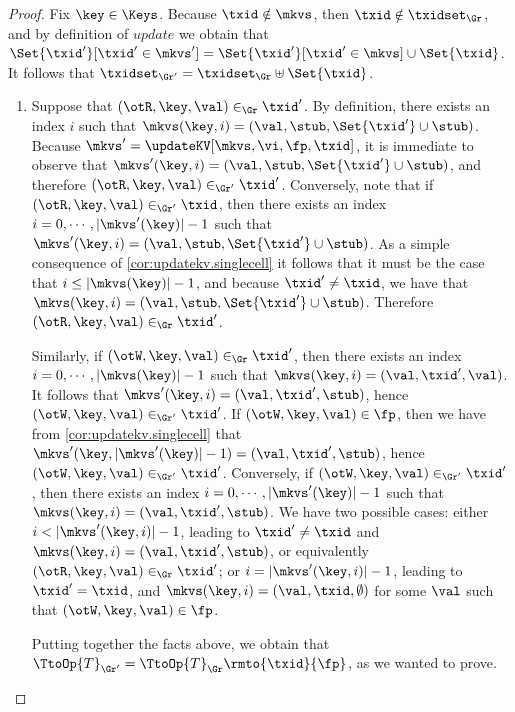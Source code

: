 \begin{proof}
Fix $\key \in \Keys$. Because $\txid \notin \mkvs$, then $\txid \notin \txidset_{\Gr}$, 
and by definition of $update$ we obtain that $\Set{\txid'}[\txid' \in \mkvs'] = 
\Set{\txid'}[\txid' \in \mkvs] \cup \Set{\txid}$. It follows that $\txidset_{\Gr'} = \txidset_{\Gr} \uplus \Set{\txid }$.

\begin{enumerate}
\item Suppose that $(\otR, \key, \val) \in_{\Gr} \txid'$. By definition, 
there exists an index $i$ such 
that $\mkvs(\key, i) = (\val, \stub, \Set{\txid'} \cup \stub)$. Because $\mkvs' = \updateKV[\mkvs, \vi, \fp, \txid]$, 
it is immediate to observe that $\mkvs'(\key, i) = (\val, \stub, \Set{\txid'} \cup \stub)$, and therefore 
$(\otR,\key, \val) \in_{\Gr'} \txid'$. Conversely, note that if $(\otR, \key, \val) \in_{\Gr'} \txid$, 
then there exists an index $i = 0,\cdots, \lvert \mkvs'(\key) \rvert - 1$ such that 
$\mkvs'(\key, i) = (\val, \stub, \Set{\txid'} \cup \stub)$. As a simple consequence of \cref{cor:updatekv.singlecell} 
it follows that it must be the case that $i \leq \lvert \mkvs(\key) \rvert - 1$, and because 
$\txid' \neq \txid$, we have that $\mkvs(\key, i) = (\val, \stub, \Set{\txid'} \cup \stub)$. Therefore 
$(\otR, \key, \val) \in_{\Gr} \txid'$. 

Similarly, if $(\otW, \key, \val) \in_{\Gr} \txid'$, 
then there exists an index $i=0,\cdots, \lvert \mkvs(\key) \rvert - 1$ such that 
$\mkvs(\key, i) = (\val, \txid', \val)$. It follows that $\mkvs'(\key, i) = (\val, \txid', \stub)$, hence 
$(\otW, \key, \val) \in_{\Gr'} \txid'$. If $(\otW, \key, \val) \in \fp$, then we 
have from \cref{cor:updatekv.singlecell} that $\mkvs'(\key, \lvert \mkvs'(\key) \rvert - 1) = (\val, \txid', \stub)$, 
hence $(\otW, \key, \val) \in_{\Gr'} \txid'$. 
Conversely, if $(\otW, \key, \val) \in_{\Gr'} \txid'$, then there exists an index 
$i = 0, \cdots, \lvert \mkvs'(\key) \rvert - 1$ such that $\mkvs(\key, i) = (\val, \txid', \stub)$. 
We have two possible cases: either $i < \lvert \mkvs'(\key, i) \rvert - 1$, leading to  
$\txid' \neq \txid$ and $\mkvs(\key, i) = (\val, \txid', \stub)$, or equivalently 
$(\otR,\key, \val) \in_{\Gr} \txid'$; or $i = \lvert \mkvs'(\key, i) \rvert - 1$, 
leading to $\txid' = \txid$, and $\mkvs(\key, i) = (\val, \txid, \emptyset)$ 
for some $\val$ such that $(\otW, \key, \val) \in \fp$. 

Putting together the facts above, we obtain that $\TtoOp{T}_{\Gr'} = 
\TtoOp{T}_{\Gr}\rmto{\txid}{\fp}$, as we wanted to prove.


\end{enumerate}
\end{proof}
